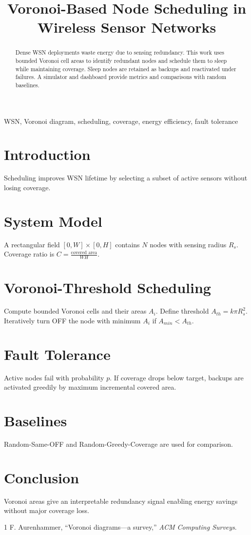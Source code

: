 \documentclass[conference]{IEEEtran}
\title{Voronoi-Based Node Scheduling in Wireless Sensor Networks}
\author{\IEEEauthorblockN{Om Seth}\IEEEauthorblockA{Semester 6 Project}}
\begin{document}
\maketitle
\begin{abstract}
Dense WSN deployments waste energy due to sensing redundancy. This work uses bounded Voronoi cell areas to identify redundant nodes and schedule them to sleep while maintaining coverage. Sleep nodes are retained as backups and reactivated under failures. A simulator and dashboard provide metrics and comparisons with random baselines.
\end{abstract}
\begin{IEEEkeywords}
WSN, Voronoi diagram, scheduling, coverage, energy efficiency, fault tolerance
\end{IEEEkeywords}
\section{Introduction}
Scheduling improves WSN lifetime by selecting a subset of active sensors without losing coverage.
\section{System Model}
A rectangular field $[0,W]\times[0,H]$ contains $N$ nodes with sensing radius $R_s$. Coverage ratio is
$C=\frac{\text{covered area}}{WH}$.
\section{Voronoi-Threshold Scheduling}
Compute bounded Voronoi cells and their areas $A_i$. Define threshold
$A_{th}=k\pi R_s^2$. Iteratively turn OFF the node with minimum $A_i$ if $A_{min}<A_{th}$.
\section{Fault Tolerance}
Active nodes fail with probability $p$. If coverage drops below target, backups are activated greedily by maximum incremental covered area.
\section{Baselines}
Random-Same-OFF and Random-Greedy-Coverage are used for comparison.
\section{Conclusion}
Voronoi areas give an interpretable redundancy signal enabling energy savings without major coverage loss.

\begin{thebibliography}{1}
F. Aurenhammer, ``Voronoi diagrams---a survey,'' \emph{ACM Computing Surveys}.
\end{thebibliography}
\end{document}
